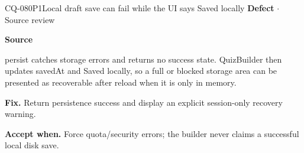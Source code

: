 \begin{finding}{CQ-080}{P1}{Local draft save can fail while the UI says Saved locally}
\textbf{Defect} $\cdot$ Source review\par
\textbf{Source}\quad{}\par
persist catches storage errors and returns no success state. QuizBuilder then updates savedAt and Saved locally, so a full or blocked storage area can be presented as recoverable after reload when it is only in memory.\par
\textbf{Fix.} Return persistence success and display an explicit session-only recovery warning.\par
\textbf{Accept when.} Force quota/security errors; the builder never claims a successful local disk save.
\end{finding}
\clearpage
